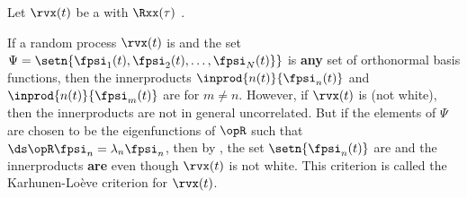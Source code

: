 \begin{definition}
\label{def:white}
Let $\rvx(t)$ be a  with  $\Rxx(\tau)$ .
\end{definition}

If a random process $\rvx(t)$ is  
and the set $\Psi=\setn{\fpsi_1(t),\fpsi_2(t),\ldots,\fpsi_N(t)\}}$
is \textbf{any} set of orthonormal basis functions, then the innerproducts
$\inprod{n(t)}{\fpsi_n(t)}$ and $\inprod{n(t)}{\fpsi_m(t)}$ are 
for $m\ne  n$.
However, if $\rvx(t)$ is  (not white), then the innerproducts are not
in general uncorrelated.
But if the elements of $\Psi$ are chosen to be the eigenfunctions of $\opR$ such
that $\ds\opR \fpsi_n = \lambda_n \fpsi_n$,
then by , the set $\setn{\fpsi_n(t)}$ are  and
the innerproducts \textbf{are}  even though $\rvx(t)$ is
not white.
This criterion is called the  Karhunen-Lo\`{e}ve criterion for $\rvx(t)$.

